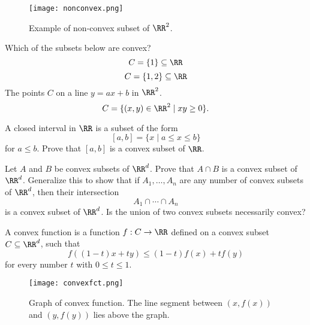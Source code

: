 \documentclass{article}
\begin{document}
\begin{figure}
  \texttt{[image: nonconvex.png]}
  \begin{center}
    Example of non-convex subset of $\RR^2$.
  \end{center}
\end{figure}


\begin{quizexercise}[showhide]
  \begin{quiz}
    \question
    Which of the subsets below are convex?
    $$C=\{1\}\subseteq \RR$$
    $$C=\{1, 2\}\subseteq \RR$$
    The points $C$ on a line $y = a x + b$ in $\RR^2$.
    $$
    C=\{(x, y)\in \RR^2 \mid x y \geq 0\}.
    $$
  \end{quiz}
\end{quizexercise}

    \beginshex
      A closed interval in $\RR$ is a subset of the form
      $$
      [a, b] = \{x \mid a \leq x \leq b\}
      $$
      for $a \leq b$. Prove that $[a, b]$ is a convex subset of $\RR$.
      \endshex


    \beginshex
    Let $A$ and $B$ be convex subsets of $\RR^d$. Prove that $A\cap B$ is a
    convex subset of $\RR^d$. Generalize this to show that if $A_1, \dots, A_n$
    are any number of convex subsets of $\RR^d$, then their intersection
    $$
    A_1 \cap \cdots \cap A_n
    $$
    is a convex subset of $\RR^d$. Is the union of two convex subsets necessarily convex?
    \endshex
    
    \begin{definition}[emph]
    A convex function is a function $f: C\rightarrow \RR$
    defined on a convex subset $C\subseteq \RR^d$, such that
    $$
    f((1 - t) x + t y) \leq (1-t) f(x) + t f(y)
    $$
    for every number $t$ with $0\leq t \leq 1$.
    \end{definition}

\begin{figure}
  \texttt{[image: convexfct.png]}
  \begin{center}
    Graph of convex function. The line segment between $(x, f(x))$ and $(y, f(y))$
    lies above the graph.
  \end{center}
\end{figure}
\end{document}
